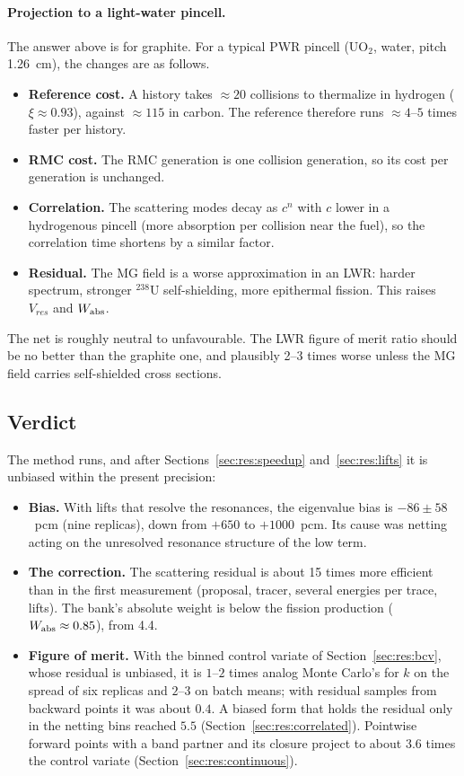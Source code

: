 \paragraph{Projection to a light-water pincell.} The answer above is for graphite. For a typical PWR
pincell (UO$_2$, water, pitch 1.26~cm), the changes are as follows.
\begin{itemize}
\item \textbf{Reference cost.} A history takes $\approx20$ collisions to thermalize in hydrogen
  ($\xi\approx0.93$), against $\approx115$ in carbon. The reference therefore runs $\approx4$--$5$
  times faster per history.
\item \textbf{RMC cost.} The RMC generation is one collision generation, so its cost per generation
  is unchanged.
\item \textbf{Correlation.} The scattering modes decay as $c^n$ with $c$ lower in a hydrogenous
  pincell (more absorption per collision near the fuel), so the correlation time shortens by a
  similar factor.
\item \textbf{Residual.} The MG field is a worse approximation in an LWR: harder spectrum, stronger
  $^{238}$U self-shielding, more epithermal fission. This raises $V_{res}$ and $W_{\mathrm{abs}}$.
\end{itemize}
The net is roughly neutral to unfavourable. The LWR figure of merit ratio should be no better than
the graphite one, and plausibly 2--3 times worse unless the MG field carries self-shielded
cross sections.

\subsection{Verdict}

The method runs, and after Sections~\ref{sec:res:speedup} and~\ref{sec:res:lifts} it is unbiased
within the present precision:
\begin{itemize}
\item \textbf{Bias.} With lifts that resolve the resonances, the eigenvalue bias is $-86\pm58$~pcm
  (nine replicas), down from $+650$ to $+1000$~pcm. Its cause was netting acting on the unresolved
  resonance structure of the low term.
\item \textbf{The correction.} The scattering residual is about 15 times more efficient than in the
  first measurement (proposal, tracer, several energies per trace, lifts). The bank's absolute
  weight is below the fission production ($W_{\mathrm{abs}}\approx0.85$), from 4.4.
\item \textbf{Figure of merit.} With the binned control variate of Section~\ref{sec:res:bcv}, whose
  residual is unbiased, it is $1$--$2$ times analog Monte Carlo's for $k$ on the spread of six
  replicas and $2$--$3$ on batch means; with residual samples from backward points it was about
  $0.4$. A biased form that holds the residual only in the netting bins reached $5.5$
  (Section~\ref{sec:res:correlated}). Pointwise forward points with a band partner and its closure
  project to about $3.6$ times the control variate (Section~\ref{sec:res:continuous}).
\end{itemize}

